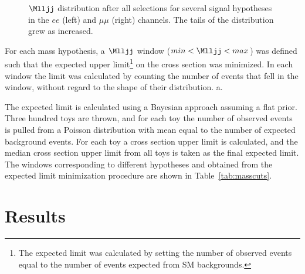 \begin{figure}[btp]
	\centering
	\label{fig:signalShapesAfterSelection}
	\caption{$\Mlljj$ distribution after all selections for several \WR signal hypotheses in the $ee$ (left) and $\mu\mu$ (right) 
		channels.  The tails of the distribution grew as \mWR increased.}
\end{figure}




For each \mWR mass hypothesis, a $\Mlljj$ window ($ min < \Mlljj < max$) was defined such 
that the expected upper limit\footnote{The expected limit was calculated by setting the 
number of observed events equal to the number of events expected from SM backgrounds.} on 
the \WR cross section was minimized.  In each window the limit was calculated by counting 
the number of events that fell in the window, without regard to the shape of their distribution.  
a.


The expected limit is calculated using a Bayesian approach assuming a flat prior.  Three hundred toys are thrown, and for each toy the number of observed
events is pulled from a Poisson distribution with mean equal to the number of expected background events.  For each toy a \WR cross section upper limit is calculated, and the
median cross section upper limit from all toys is taken as the final expected limit.
The \Mlljj windows corresponding to different \MWR hypotheses and obtained from the expected limit minimization procedure are shown in Table~\ref{tab:masscuts}.




\section{Results}
\label{sec:searchResults}


